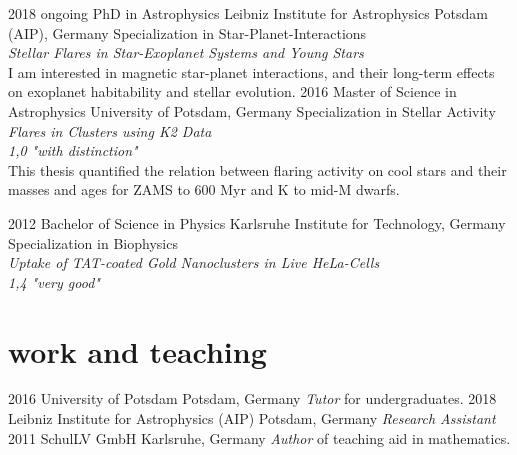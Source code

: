 \documentclass[]{k-cv} %
\begin{document}
\begin{entrylist}
\entry
{2018 \to ongoing}
{PhD {\normalfont in Astrophysics}}
{Leibniz Institute for Astrophysics Potsdam (AIP), Germany}
{Specialization in Star-Planet-Interactions\\
\emph{Stellar Flares in Star-Exoplanet Systems and Young Stars} \vspace{0.2cm}\\ I am interested in magnetic star-planet interactions, and their long-term effects on exoplanet habitability and stellar evolution.}
\entry
{2016 }
{Master {\normalfont of Science in Astrophysics}}
{University of Potsdam, Germany}
{Specialization in Stellar Activity\\
\emph{Flares in Clusters using K2 Data} \\ 
\emph{1,0 "with distinction"}\vspace{0.2cm}\\
This thesis quantified the relation between flaring activity on cool stars and their masses and ages for ZAMS to 600 Myr and K to mid-M dwarfs.}


\entry
{2012 }
{Bachelor {\normalfont of Science in Physics}}
{Karlsruhe Institute for Technology, Germany}
{Specialization in Biophysics\\
\emph{Uptake of TAT-coated Gold Nanoclusters in Live HeLa-Cells}\\
\emph{1,4 "very good"}}
\end{entrylist}

\section{work and teaching}

\begin{entrylist}
\entry
{2016 }
{University of Potsdam}
{Potsdam, Germany}
{\emph{Tutor} for undergraduates.}
\entry
{2018}
{Leibniz Institute for Astrophysics (AIP)}
{Potsdam, Germany}
{\emph{Research Assistant}}
\entry
{2011 }
{SchulLV GmbH}
{Karlsruhe, Germany}
{\emph{Author} of teaching aid in mathematics.}
\end{entrylist}
\end{document}
